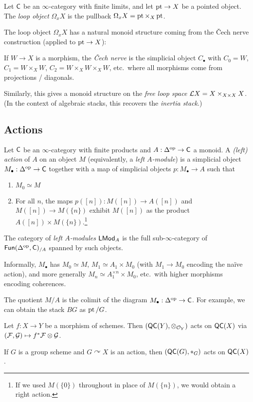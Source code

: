 \documentclass{article}
\begin{document}
\begin{dfn}
	Let $\mathsf{C}$ be an $\infty$-category with finite limits, and let $\operatorname{pt} \to X$ be a pointed object.
	The \emph{loop object} $\Omega_x X$ is the pullback $\Omega_x X = \operatorname{pt} \times_X \operatorname{pt}$.
\end{dfn}

The loop object $\Omega_x X$ has a natural monoid structure coming from the \v{C}ech nerve construction (applied to $\operatorname{pt} \to X$):

\begin{dfn}
	If $W \to X$ is a morphism, the \emph{\v{C}ech nerve} is the simplicial object $C_\bullet$ with $C_0 = W$, $C_1 = W \times_X W$, $C_2 = W \times_X W \times_X W$, etc.\ where all morphisms come from projections / diagonals.
\end{dfn}

Similarly, this gives a monoid structure on the \emph{free loop space} $\mathcal{L} X = X \times_{X \times X} X$.
(In the context of algebraic stacks, this recovers the \emph{inertia stack}.)

\subsection{Actions}

\begin{dfn}
	Let $\mathsf{C}$ be an $\infty$-category with finite products and $A: \Delta^{\mathrm{op}} \to \mathsf{C}$ a monoid.
	A \emph{(left) action} of $A$ on an object $M$ (equivalently, a \emph{left $A$-module}) is a simplicial object $M_\bullet: \Delta^{\mathrm{op}} \to \mathsf{C}$ together with a map of simplicial objects $p: M_\bullet \to A$ such that
	\begin{enumerate}
		\item $M_0 \simeq M$
		\item For all $n$, the maps $p([n]): M([n]) \to A([n])$ and $M([n]) \to M(\{n\})$ exhibit $M([n])$ as the product $A([n]) \times M(\{n\})$.\footnote{If we used $M(\{0\})$ throughout in place of $M(\{n\})$, we would obtain a right action.}
	\end{enumerate}
	The category of \emph{left $A$-modules} $\mathsf{LMod}_A$ is the full sub-$\infty$-category of $\mathsf{Fun}(\Delta^{\mathrm{op}}, \mathsf{C})_{/A}$ spanned by such objects.
\end{dfn}

Informally, $M_\bullet$ has $M_0 \simeq M$, $M_1 \simeq A_1 \times M_0$ (with $M_1 \to M_0$ encoding the na\"ive action), and more generally $M_n \simeq A_1^{\times n} \times M_0$, etc.\ with higher morphisms encoding coherences.

The quotient $M / A$ is the colimit of the diagram $M_\bullet: \Delta^{\mathrm{op}} \to \mathsf{C}$.
For example, we can obtain the stack $BG$ as $\operatorname{pt} / G$.

\begin{ex}
	Let $f: X \to Y$ be a morphism of schemes.
	Then $(\mathsf{QC}(Y), \otimes_{\mathcal{O}_Y})$ acts on $\mathsf{QC}(X)$ via $(\mathcal{F}, \mathcal{G}) \mapsto f^* \mathcal{F} \otimes \mathcal{G}$.
\end{ex}

\begin{ex}
	If $G$ is a group scheme and $G \curvearrowright X$ is an action, then $(\mathsf{QC}(G), *_G)$ acts on $\mathsf{QC}(X)$.
\end{ex}
\end{document}
